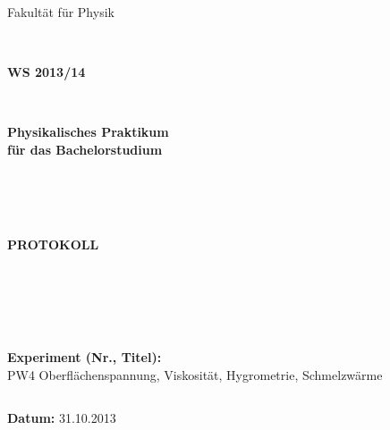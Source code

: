 \documentclass[12pt,a4paper]{article}
\begin{document}
%
%
% 

%




\thispagestyle{empty}
			\begin{center}
			\Large{Fakultät für Physik}\\
			\end{center}
\begin{verbatim}


\end{verbatim}
			\begin{center}
			\textbf{\LARGE WS 2013/14}
			\end{center}
\begin{verbatim}


\end{verbatim}
			\begin{center}
			\textbf{\LARGE{Physikalisches Praktikum\\ für das Bachelorstudium}}
			\end{center}
\begin{verbatim}




\end{verbatim}

			\begin{center}
			\textbf{\LARGE{PROTOKOLL}}
			\end{center}
			
\begin{verbatim}





\end{verbatim}

			\begin{flushleft}
			\textbf{\Large{Experiment (Nr., Titel):}}\\
			\LARGE{PW4 Oberflächenspannung, Viskosität, Hygrometrie, Schmelzwärme}	
			\end{flushleft}

\begin{verbatim}

\end{verbatim}	
			\begin{flushleft}
			\textbf{\Large{Datum:}} \Large{31.10.2013}
			\end{flushleft}
			
\end{document}
